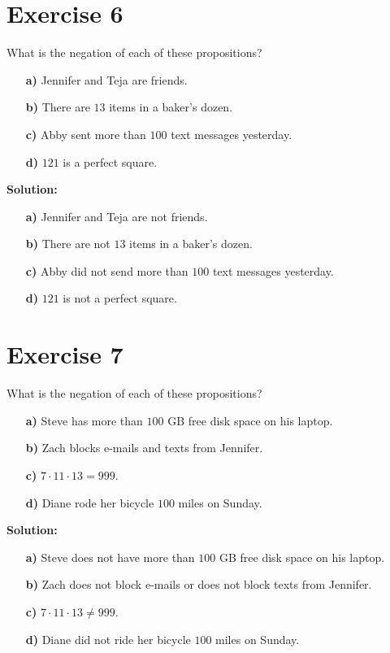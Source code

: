 \documentclass{Axon}
\begin{document}
\section*{Exercise 6}
What is the negation of each of these propositions?
\begin{enumerate}
    \item[\textbf{a)}] Jennifer and Teja are friends.
    \item[\textbf{b)}] There are \(13\) items in a baker's dozen.
    \item[\textbf{c)}] Abby sent more than \(100\) text messages yesterday.
    \item[\textbf{d)}] \(121\) is a perfect square.
\end{enumerate}

\noindent
\textbf{Solution:}
\begin{enumerate}
    \item[\textbf{a)}] Jennifer and Teja are not friends.
    \item[\textbf{b)}] There are not \(13\) items in a baker's dozen.
    \item[\textbf{c)}] Abby did not send more than \(100\) text messages yesterday.
    \item[\textbf{d)}] \(121\) is not a perfect square.
\end{enumerate}

\section*{Exercise 7}
What is the negation of each of these propositions?
\begin{enumerate}
    \item[\textbf{a)}] Steve has more than \(100\) GB free disk space on his laptop.
    \item[\textbf{b)}] Zach blocks e-mails and texts from Jennifer.
    \item[\textbf{c)}] \(7 \cdot 11 \cdot 13 = 999\).
    \item[\textbf{d)}] Diane rode her bicycle \(100\) miles on Sunday.
\end{enumerate}

\noindent
\textbf{Solution:}
\begin{enumerate}
    \item[\textbf{a)}] Steve does not have more than \(100\) GB free disk space on his laptop.
    \item[\textbf{b)}] Zach does not block e-mails or does not block texts from Jennifer.
    \item[\textbf{c)}] \(7 \cdot 11 \cdot 13 \neq 999\).
    \item[\textbf{d)}] Diane did not ride her bicycle \(100\) miles on Sunday.
\end{enumerate}
\end{document}
